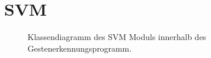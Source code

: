 \section{\acs{SVM}}
\begin{figure}[h]
  \begin{center}
  \caption[\acs{LSTM} Klassendiagramm]{Klassendiagramm des \acs{SVM} Moduls innerhalb des Gestenerkennungsprogramm. }
  \label{fig:svm_class}
  \end{center}
\end{figure}
